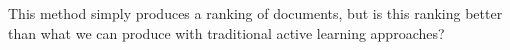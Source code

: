 \documentclass[9pt,aspectratio=169]{beamer}
\begin{document}
\begin{frame}{This method simply produces a ranking of documents, but is this ranking better than what we can produce with traditional active learning approaches?}
\begin{columns}
\begin{column}{0.618\linewidth}
\begin{figure}

\end{figure}
\end{column}
\end{columns}
\end{frame}
\end{document}
